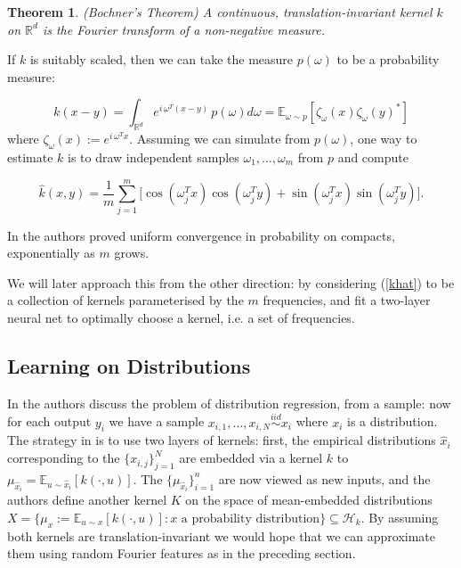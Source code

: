 \documentclass{article} %
\newtheorem{theorem}{Theorem}
\begin{document}
\begin{theorem} (Bochner's Theorem) \cite{Rahimi}
A continuous, translation-invariant kernel $k$ on $\mathbb{R}^d$ is the Fourier transform of a non-negative measure.
\end{theorem}

\noindent If $k$ is suitably scaled, then we can take the measure $p(\omega)$ to be a probability measure:

$$k(x-y)=\int_{\mathbb{R}^d} e^{i\,\omega^T (x-y)}\, p(\omega)d\omega=\mathbb{E}_{\omega\sim p}[\zeta_\omega(x) \zeta_\omega(y)^*]$$ where $\zeta_\omega(x):=e^{i\,\omega^T x}$. Assuming we can simulate from $p(\omega)$, one way to estimate $k$ is to draw independent samples $\omega_1,\dots,\omega_m$ from $p$ and compute

\begin{equation}
\label{khat}
 \hat{k}(x,y)=\frac{1}{m}\sum_{j=1}^m \big[\cos(\omega_j^T x)\cos(\omega_j^T y) + \sin (\omega_j^T x) \sin (\omega_j^T y)\big].
\end{equation}

\noindent In \cite{Rahimi} the authors proved uniform convergence in probability on compacts, exponentially as $m$ grows.

We will later approach this from the other direction: by considering (\ref{khat}) to be a collection of kernels parameterised by the $m$ frequencies, and fit a two-layer neural net to optimally choose a kernel, i.e. a set of frequencies.

\subsection{Learning on Distributions}

In \cite{Szabo} the authors discuss the problem of distribution regression, from a sample: now for each output $y_i$ we have a sample $x_{i,1},\dots,x_{i,N} 
\stackrel{iid}{\sim} x_i$ where $x_i$ is a distribution. The strategy in \cite{Szabo} is to use two layers of kernels: first, the empirical distributions $\hat{x}_i$ corresponding to the $\{x_{i,j}\}_{j=1}^N$ are embedded via a kernel $k$ to $\mu_{\hat{x}_i}=\mathbb{E}_{u \sim\hat{x}_i}[k(\cdot,u)]$. The $\{\mu_{\hat{x}_i}\}_{i=1}^n$ are now viewed as new inputs, and the authors define another kernel $K$ on the space of mean-embedded distributions $X=\{\mu_x:= \mathbb{E}_{u\sim x}[k(\cdot,u)]: x \text{ a probability distribution}\}\subseteq \mathcal{H}_k$. By assuming both kernels are translation-invariant we would hope that we can approximate them using random Fourier features as in the preceding section.
\end{document}
